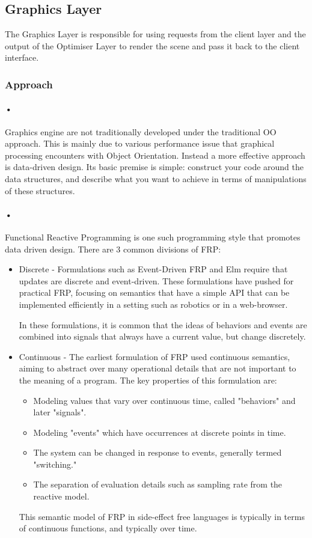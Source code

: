 \documentclass[11pt]{article}
\begin{document}
\subsection{Graphics Layer}
The Graphics Layer is responsible for using requests from the client layer and the output of the Optimiser Layer to render the scene and pass it back to the client interface.
\subsubsection{Approach}
\paragraph{•}
Graphics engine are not traditionally developed under the traditional OO approach. This is mainly due to various performance issue that graphical processing encounters with Object Orientation. Instead a more effective approach is data-driven design. Its basic premise is simple: construct your code around the data structures, and describe what you want to achieve in terms of manipulations of these structures.

\paragraph{•}
Functional Reactive Programming is one such programming style that promotes data driven design. There are 3 common divisions of FRP:
\begin{itemize}
\item Discrete - Formulations such as Event-Driven FRP and Elm require that updates are discrete and event-driven. These formulations have pushed for practical FRP, focusing on semantics that have a simple API that can be implemented efficiently in a setting such as robotics or in a web-browser.

In these formulations, it is common that the ideas of behaviors and events are combined into signals that always have a current value, but change discretely.

\item Continuous - The earliest formulation of FRP used continuous semantics, aiming to abstract over many operational details that are not important to the meaning of a program. The key properties of this formulation are:
\begin{itemize}
\item Modeling values that vary over continuous time, called "behaviors" and later "signals".
\item Modeling "events" which have occurrences at discrete points in time.
\item The system can be changed in response to events, generally termed "switching."
\item The separation of evaluation details such as sampling rate from the reactive model.
\end{itemize}

This semantic model of FRP in side-effect free languages is typically in terms of continuous functions, and typically over time.
\end{itemize}
\end{document}
